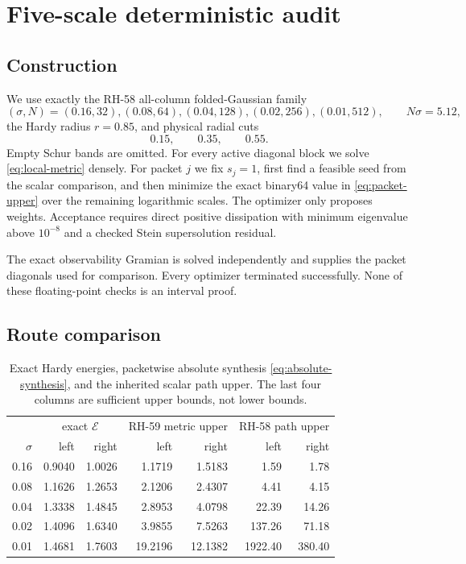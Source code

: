 \documentclass[11pt]{article}
\theoremstyle{remark}
\newcommand{\cE}{\mathcal E}
\begin{document}
\section{Five-scale deterministic audit}
\label{sec:audit}

\subsection{Construction}

We use exactly the RH-58 all-column folded-Gaussian family
\[
 (\sigma,N)=(0.16,32),(0.08,64),(0.04,128),(0.02,256),(0.01,512),
 \qquad N\sigma=5.12,
\]
the Hardy radius $r=0.85$, and physical radial cuts
\begin{equation}
 0.15,\qquad0.35,\qquad0.55.
 \label{eq:cuts}
\end{equation}
Empty Schur bands are omitted.  For every active diagonal block we solve
\eqref{eq:local-metric} densely.  For packet $j$ we fix $s_j=1$, first find
a feasible seed from the scalar comparison, and then minimize the exact
binary64 value in \eqref{eq:packet-upper} over the remaining logarithmic
scales.  The optimizer only proposes weights.  Acceptance requires direct
positive dissipation with minimum eigenvalue above $10^{-8}$ and a checked
Stein supersolution residual.

The exact observability Gramian is solved independently and supplies the
packet diagonals used for comparison.  Every optimizer terminated
successfully.  None of these floating-point checks is an interval proof.

\subsection{Route comparison}

\begin{table}[H]
\centering
\small
\begin{tabular}{@{}r|rr|rr|rr@{}}
\toprule
&\multicolumn{2}{c|}{exact $\cE$}
&\multicolumn{2}{c|}{RH-59 metric upper}
&\multicolumn{2}{c}{RH-58 path upper}\\
$\sigma$&left&right&left&right&left&right\\
\midrule
0.16&0.9040&1.0026&1.1719&1.5183&1.59&1.78\\
0.08&1.1626&1.2653&2.1206&2.4307&4.41&4.15\\
0.04&1.3338&1.4845&2.8953&4.0798&22.39&14.26\\
0.02&1.4096&1.6340&3.9855&7.5263&137.26&71.18\\
0.01&1.4681&1.7603&19.2196&12.1382&1922.40&380.40\\
\bottomrule
\end{tabular}
\caption{Exact Hardy energies, packetwise absolute synthesis
\eqref{eq:absolute-synthesis}, and the inherited scalar path upper.  The
last four columns are sufficient upper bounds, not lower bounds.}
\label{tab:route}
\end{table}
\end{document}
